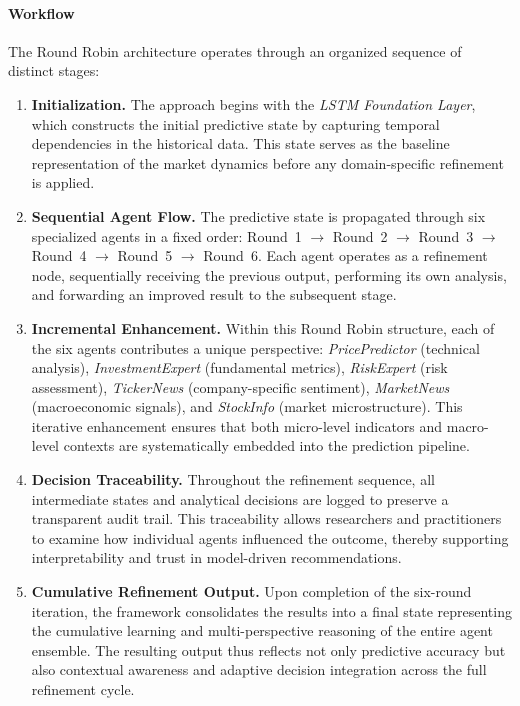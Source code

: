 \documentclass{ieeeaccess}
\begin{document}
\paragraph{Workflow} The Round Robin architecture operates through an organized sequence of distinct stages:

\begin{enumerate}
    \item \textbf{Initialization.} The approach begins with the  \textit{LSTM Foundation Layer}, which constructs the initial predictive state by capturing temporal dependencies in the historical data. This state serves as the baseline representation of the market dynamics before any domain-specific refinement is applied.  

    \item \textbf{Sequential Agent Flow.} The predictive state is propagated through six specialized agents in a fixed order: Round~1 $\rightarrow$ Round~2 $\rightarrow$ Round~3 $\rightarrow$ Round~4 $\rightarrow$ Round~5 $\rightarrow$ Round~6. Each agent operates as a refinement node, sequentially receiving the previous output, performing its own analysis, and forwarding an improved result to the subsequent stage.  

    \item \textbf{Incremental Enhancement.} Within this Round Robin structure, each of the six agents contributes a unique perspective: \textit{PricePredictor} (technical analysis), \textit{InvestmentExpert} (fundamental metrics), \textit{RiskExpert} (risk assessment), \textit{TickerNews} (company-specific sentiment), \textit{MarketNews} (macroeconomic signals), and \textit{StockInfo} (market microstructure). This iterative enhancement ensures that both micro-level indicators and macro-level contexts are systematically embedded into the prediction pipeline.  

    \item \textbf{Decision Traceability.} Throughout the refinement sequence, all intermediate states and analytical decisions are logged to preserve a transparent audit trail. This traceability allows researchers and practitioners to examine how individual agents influenced the outcome, thereby supporting interpretability and trust in model-driven recommendations.  

    \item \textbf{Cumulative Refinement Output.} Upon completion of the six-round iteration, the framework consolidates the results into a final state representing the cumulative learning and multi-perspective reasoning of the entire agent ensemble. The resulting output thus reflects not only predictive accuracy but also contextual awareness and adaptive decision integration across the full refinement cycle.  
\end{enumerate}
\end{document}
